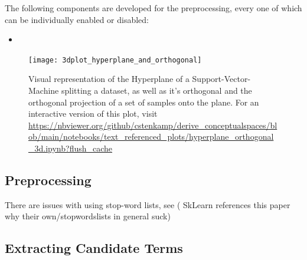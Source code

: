 The following components are developed for the preprocessing, every one of which can be individually enabled or disabled:
\begin{itemize}
	\item 
\end{itemize}























\begin{figure}
	\begin{center}
	  \texttt{[image: 3dplot\_hyperplane\_and\_orthogonal]}
	  \caption[Visual representation of the Hyperplane of an SVM splitting a dataset]{ \label{fig:3d_hyperplane_ortho} Visual representation of the Hyperplane of a Support-Vector-Machine splitting a dataset, as well as it's orthogonal and the orthogonal projection of a set of samples onto the plane. For an interactive version of this plot, visit  {\small \url{https://nbviewer.org/github/cstenkamp/derive_conceptualspaces/blob/main/notebooks/text_referenced_plots/hyperplane_orthogonal_3d.ipynb?flush_cache}}}
	\end{center}
\end{figure}




\subsection{Preprocessing}

There are issues with using stop-word lists, see \cite{nothman-etal-2018-stop} ( SkLearn references this paper why their own/stopwordslists in general suck)





\subsection{Extracting Candidate Terms}
\label{sec:extract_candidates}

